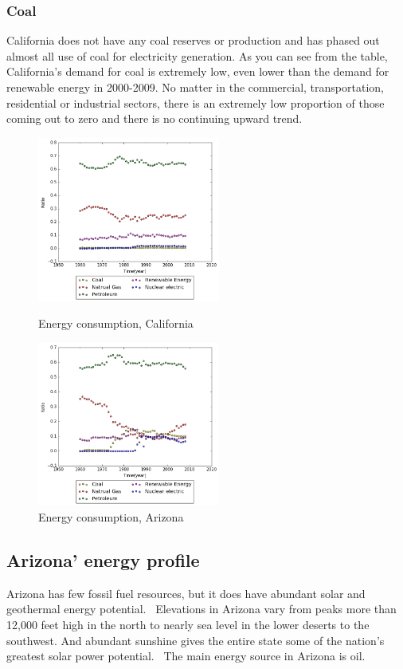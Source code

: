 \documentclass{mcmthesis}
\begin{document}
\subsubsection{Coal}
  California does not have any coal reserves or production and has phased out almost all use of coal for electricity generation.
  As you can see from the table, California's demand for coal is extremely low, even lower than the demand for renewable energy in 2000-2009.
  No matter in the commercial, transportation, residential or industrial sectors, there is an extremely low proportion of those coming out to zero and there is no continuing upward trend.
  \begin{figure}[htbp]
  \centering
  \begin{minipage}[t]{0.48\textwidth}
  \centering
  \includegraphics[width=6cm]{energyprofile_ca.png}
  \caption{Energy consumption, California}
  \end{minipage}
  \begin{minipage}[t]{0.48\textwidth}
  \centering
  \includegraphics[width=6cm]{energyprofile_az.png}
  \caption{Energy consumption, Arizona}
  \end{minipage}
  \end{figure}
\subsection{Arizona' energy profile}
Arizona has few fossil fuel resources, but it does have abundant solar and geothermal energy potential. 
Elevations in Arizona vary from peaks more than 12,000 feet high in the north to nearly sea level in the lower deserts to the southwest.
And abundant sunshine gives the entire state some of the nation’s greatest solar power potential. 
The main energy source in Arizona is oil.
\end{document}
